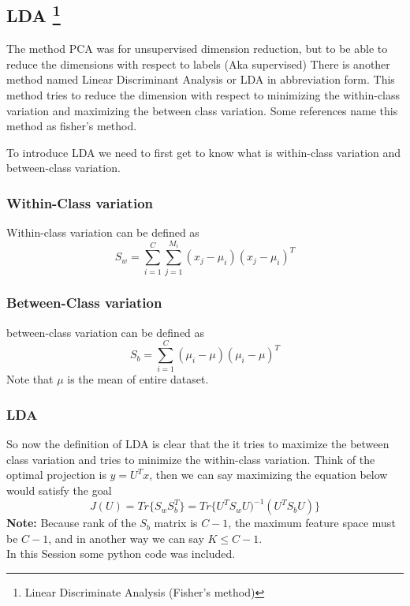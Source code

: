 \documentclass{article}
\begin{document}
\subsection{LDA \protect\footnote[1]{Linear Discriminate Analysis (Fisher's method)} }
The method PCA was for unsupervised dimension reduction, but to be able to reduce the dimensions with respect to labels (Aka supervised) There is another method named Linear Discriminant Analysis or LDA in abbreviation form. This method tries to reduce the dimension with respect to minimizing the within-class variation and maximizing the between class variation. Some references name this method as fisher's method. \par
To introduce LDA we need to first get to know what is within-class variation and between-class variation. 
\subsubsection{Within-Class variation}
Within-class variation can be defined as 
\begin{equation}
    S_w = \sum_{i=1}^{C} \sum_{j=1}^{M_i} (x_j - \mu_i)(x_j - \mu_i)^T
\end{equation}
\subsubsection{Between-Class variation}
between-class variation can be defined as
\begin{equation}
    S_b = \sum_{i=1}^{C} (\mu_i - \mu) (\mu_i - \mu)^T
\end{equation}
Note that $\mu$ is the mean of entire dataset.

\subsubsection{LDA}
So now the definition of LDA is clear that the it tries to maximize the between class variation and tries to minimize the within-class variation. Think of the optimal projection is $y=U^T x$, then we can say maximizing the equation below would satisfy the goal
\begin{equation}
    J(U) = Tr\{S_w S_b^T\} = Tr\{U^T S_w U)^{-1} (U^T S_b U)\}
\end{equation}
\textbf{Note:} Because rank of the $S_b$ matrix is $C-1$, the maximum feature space must be $C-1$, and in another way we can say $K \leq C-1$.   \\
In this Session some python code was included.
\end{document}
